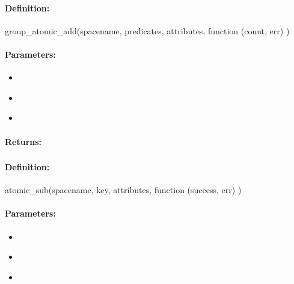 \paragraph{Definition:}
\begin{javascriptcode}
group_atomic_add(spacename, predicates, attributes, function (count, err) {})
\end{javascriptcode}
\paragraph{Parameters:}
\begin{itemize}[noitemsep]
\item {}\\

\item {}\\

\item {}\\

\end{itemize}

\paragraph{Returns:}


\pagebreak
\subsubsection{}
\label{api:nodejs:atomic_sub}


\paragraph{Definition:}
\begin{javascriptcode}
atomic_sub(spacename, key, attributes, function (success, err) {})
\end{javascriptcode}
\paragraph{Parameters:}
\begin{itemize}[noitemsep]
\item {}\\

\item {}\\

\item {}\\

\end{itemize}

